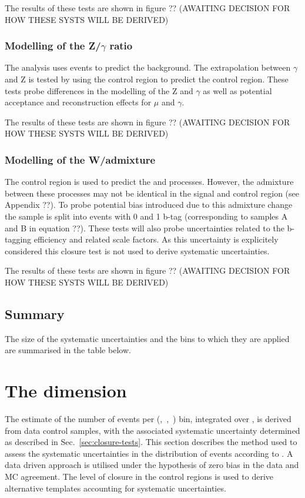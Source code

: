 The results of these tests are shown in figure ?? (AWAITING DECISION FOR HOW THESE SYSTS WILL BE DERIVED)
\subsubsection{Modelling of the Z/$\gamma$ ratio}

The \alphat analysis uses \gj events to predict the \znunu background. The extrapolation 
between $\gamma$ and Z is tested by using the \gj control region to predict the \mmj control region.
These tests probe differences in the modelling of the Z and $\gamma$ as well as potential acceptance and
reconstruction effects for $\mu$ and $\gamma$. 

The results of these tests are shown in figure ?? (AWAITING DECISION FOR HOW THESE SYSTS WILL BE DERIVED)

\subsubsection{Modelling of the W/\ttbar admixture}

The \mj control region is used to predict the \wj and \ttbar processes. However, the admixture
between these processes may not be identical in the signal and control region (see Appendix ??).
To probe potential bias introduced due to this admixture change the sample is split into events with
0 and 1 b-tag (corresponding to samples A and B in equation ??). These tests will also probe 
uncertainties related to the b-tagging efficiency and related scale factors. As this uncertainty 
is explicitely considered this closure test is not used to derive systematic uncertainties.

The results of these tests are shown in figure ?? (AWAITING DECISION FOR HOW THESE SYSTS WILL BE DERIVED)

\subsection{Summary}

The size of the systematic uncertainties and the bins to which they are applied
are summarised in the table below.

\section{The \mht dimension}
\label{sec:syst-on-shape}

The estimate of the number of events per (\njet,~\nb,~\scalht) bin,
integrated over \mht, is derived from data control samples, with
the associated systematic uncertainty determined as 
described in Sec.~\ref{sec:closure-tests}. This section
describes the method used to assess the systematic uncertainties in
the distribution of events according to \mht. A data driven approach is
utilised under the hypothesis of zero bias in the data and MC agreement.
The level of closure in the control regions is used
to derive alternative templates accounting for systematic uncertainties.

